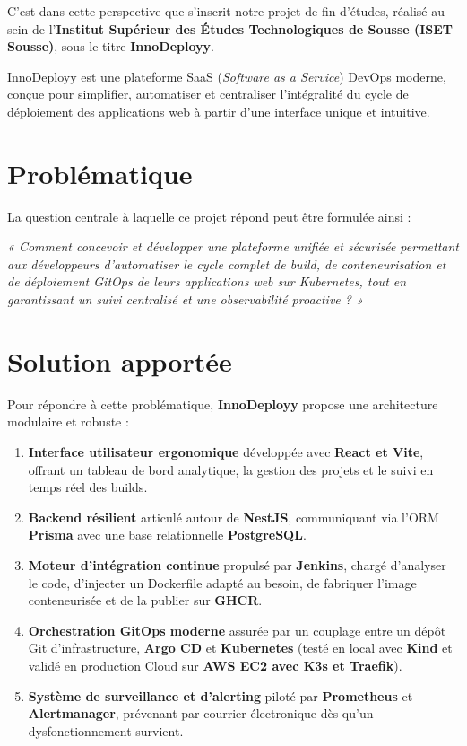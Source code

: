 \documentclass[12pt,a4paper,oneside]{report}
\begin{document}
C'est dans cette perspective que s'inscrit notre projet de fin d'études, réalisé au sein de l'\textbf{Institut Supérieur des Études Technologiques de Sousse (ISET Sousse)}, sous le titre \textbf{InnoDeployy}. 

InnoDeployy est une plateforme SaaS (\textit{Software as a Service}) DevOps moderne, conçue pour simplifier, automatiser et centraliser l'intégralité du cycle de déploiement des applications web à partir d'une interface unique et intuitive.

\section*{Problématique}
La question centrale à laquelle ce projet répond peut être formulée ainsi :
\begin{center}
\begin{tcolorbox}[colback=lightgray,colframe=primary,arc=2mm]
\centering\itshape
« Comment concevoir et développer une plateforme unifiée et sécurisée permettant aux développeurs d'automatiser le cycle complet de build, de conteneurisation et de déploiement GitOps de leurs applications web sur Kubernetes, tout en garantissant un suivi centralisé et une observabilité proactive ? »
\end{tcolorbox}
\end{center}

\section*{Solution apportée}
Pour répondre à cette problématique, \textbf{InnoDeployy} propose une architecture modulaire et robuste :
\begin{enumerate}
    \item \textbf{Interface utilisateur ergonomique} développée avec \textbf{React et Vite}, offrant un tableau de bord analytique, la gestion des projets et le suivi en temps réel des builds.
    \item \textbf{Backend résilient} articulé autour de \textbf{NestJS}, communiquant via l'ORM \textbf{Prisma} avec une base relationnelle \textbf{PostgreSQL}.
    \item \textbf{Moteur d'intégration continue} propulsé par \textbf{Jenkins}, chargé d'analyser le code, d'injecter un Dockerfile adapté au besoin, de fabriquer l'image conteneurisée et de la publier sur \textbf{GHCR}.
    \item \textbf{Orchestration GitOps moderne} assurée par un couplage entre un dépôt Git d'infrastructure, \textbf{Argo CD} et \textbf{Kubernetes} (testé en local avec \textbf{Kind} et validé en production Cloud sur \textbf{AWS EC2 avec K3s et Traefik}).
    \item \textbf{Système de surveillance et d'alerting} piloté par \textbf{Prometheus} et \textbf{Alertmanager}, prévenant par courrier électronique dès qu'un dysfonctionnement survient.
\end{enumerate}
\end{document}
